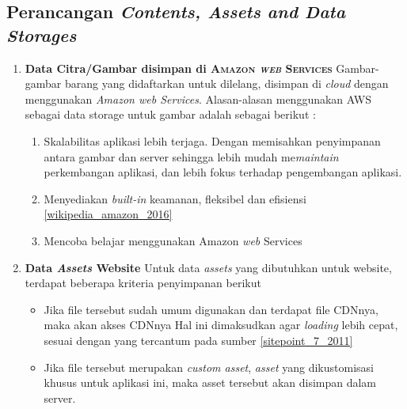     
\subsection{Perancangan \textit{Contents, Assets and Data Storages}}

	\begin{enumerate}
	    \item \textbf{Data Citra/Gambar disimpan di \textsc{Amazon \textit{web} Services}} \newline
	    \indent Gambar-gambar barang yang didaftarkan untuk dilelang, disimpan di \textit{cloud} dengan menggunakan \textit{Amazon \textit{web} Services}. Alasan-alasan menggunakan AWS sebagai data storage untuk gambar adalah sebagai berikut :
	        \begin{enumerate}[noitemsep,topsep=0pt]
	        \item Skalabilitas aplikasi lebih terjaga. 
	        \newline Dengan memisahkan penyimpanan antara gambar dan server sehingga lebih mudah me\textit{maintain} perkembangan aplikasi, dan lebih fokus terhadap pengembangan aplikasi.
	        \item Menyediakan \textit{built-in} keamanan, fleksibel dan efisiensi \ref{wikipedia_amazon_2016}
	        \item Mencoba belajar menggunakan Amazon \textit{web} Services
	        \end{enumerate}
	        
	    \item \textbf{Data \textit{Assets} Website}
	    \newline
	    \indent Untuk data \textit{assets} yang dibutuhkan untuk website, terdapat beberapa kriteria penyimpanan berikut
	    
	      \begin{itemize}[noitemsep,topsep=0pt]
	      \item Jika file tersebut sudah umum digunakan dan terdapat file CDNnya, maka akan akses CDNnya
	      \newline
	      Hal ini dimaksudkan agar \textit{loading} lebih cepat, sesuai dengan yang tercantum pada sumber \ref{sitepoint_7_2011}
	      \item Jika file tersebut merupakan \textit{custom asset}, \textit{asset} yang dikustomisasi khusus untuk aplikasi ini, maka asset tersebut akan disimpan dalam server.
	      \end{itemize}
    \end{enumerate}